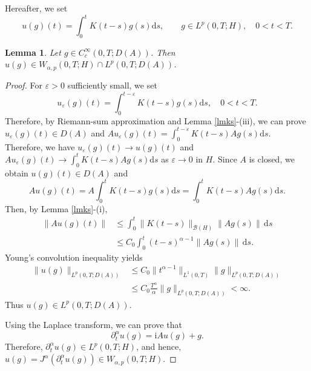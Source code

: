\documentclass[reqno]{amsart}
\newtheorem{lem}[theorem]{Lemma}
\numberwithin{equation}{section}
\def \d {\mathrm{d}}
\begin{document}
Hereafter, we set
$$u(g)(t)=\int_{0}^{t}K(t-s)g(s)\d s, \qquad g\in L^p(0,T;H),\quad 0<t<T.$$
\begin{lem}\label{strons}
Let $g \in C_c^{\infty}(0, T;D(A))$. Then $u(g) \in W_{\alpha,p}(0,T;H)\cap L^p(0,T;D(A))$.
\end{lem}
\begin{proof}
For $\varepsilon>0$ sufficiently small, we set
$$u_\varepsilon(g)(t)=\int_{0}^{t-\varepsilon}K(t-s)g(s)\d s, \quad 0<t<T.$$
Therefore, by Riemann-sum approximation and Lemma \ref{lmks}-(iii), we can prove $u_\varepsilon(g)(t)\in D(A)$ and $Au_\varepsilon(g)(t)=\displaystyle\int_{0}^{t-\varepsilon}K(t-s)Ag(s)\d s$. Therefore, we have $u_\varepsilon(g)(t) \to u(g)(t)$ and $Au_\varepsilon(g)(t) \to \displaystyle\int_{0}^{t}K(t-s)Ag(s)\d s$ as $\varepsilon \to 0$ in $H$. Since $A$ is closed, we obtain $u(g)(t)\in D(A)$ and
$$Au(g)(t)=A\int_{0}^{t}K(t-s)g(s)\d s=\int_{0}^{t}K(t-s)Ag(s)\d s.$$
Then, by Lemma \ref{lmks}-(i),
\begin{align*}
\|Au(g)(t)\| &\le \int_0^{t} \|K(t-s)\|_{\mathcal{B}(H)}\|Ag(s)\|\,\d s\\
&\le C_0 \int_0^t (t-s)^{\alpha-1}\|Ag(s)\|\,\d s.
\end{align*}
Young's convolution inequality yields
\begin{align}
\|u(g)\|_{L^p(0,T;D(A))} &\le C_0 \|t^{\alpha-1}\|_{L^1(0,T)} \|g\|_{L^p(0,T;D(A))} \nonumber\\
& \le C_0 \frac{T^\alpha}{\alpha} \|g\|_{L^p(0,T;D(A))} <\infty. \label{Weak_estimate}
\end{align}
Thus $u(g)\in L^p(0,T;D(A))$.

Using the Laplace transform, we can prove that
$$\partial_t^\alpha u(g) =\mathrm{i} Au(g)+g.$$
Therefore, $\partial_t^\alpha u(g) \in L^p(0,T;H)$, and hence, $u(g)=J^\alpha(\partial_t^\alpha u(g)) \in W_{\alpha,p}(0,T;H)$.
\end{proof}
\end{document}
